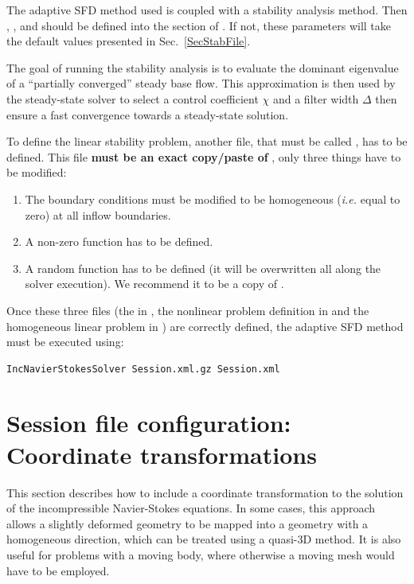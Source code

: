 The adaptive SFD method used is coupled with a stability analysis method. Then , ,  and  should be defined into the  section of . If not, these parameters will take the default values presented in Sec.~\ref{SecStabFile}.

The goal of running the stability analysis is to evaluate the dominant eigenvalue of a ``partially converged'' steady base flow. This approximation is then used by the steady-state solver to select a control coefficient $\chi$ and a filter width $\Delta$ then ensure a fast convergence towards a steady-state solution.

To define the linear stability problem, another file, that must be called , has to be defined. This file \textbf{must be an exact copy/paste of} , only three things have to be modified:
\begin{enumerate}
\item The boundary conditions must be modified to be homogeneous (\textit{i.e.} equal to zero) at all inflow boundaries.
\item A non-zero function  has to be defined.
\item A random function  has to be defined (it will be overwritten all along the solver execution). We recommend it to be a copy of .
\end{enumerate}

Once these three files (the   in , the nonlinear problem definition in  and the homogeneous linear problem in ) are correctly defined, the adaptive SFD method must be executed using:

\begin{lstlisting}[style=BashInputStyle]
IncNavierStokesSolver Session.xml.gz Session.xml
\end{lstlisting}


\section{Session file configuration: Coordinate transformations}
\label{sec:mapping}

This section describes how to include a coordinate transformation
to the solution of the incompressible Navier-Stokes equations.
In some cases, this approach allows a slightly deformed geometry to
be mapped into a geometry with a homogeneous direction, which can be treated
using a quasi-3D method. It is also useful for problems with a moving body,
 where otherwise a moving mesh would have to be employed.
 
